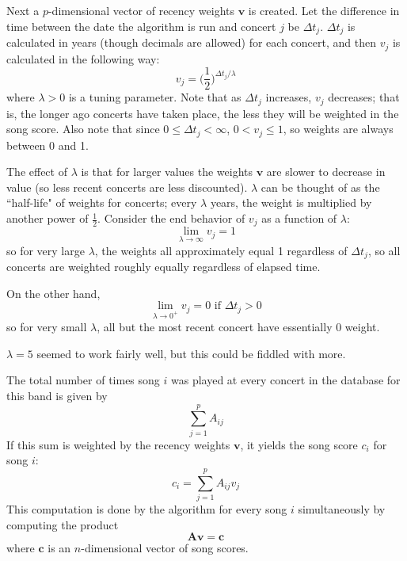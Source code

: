 \documentclass{article}
\begin{document}
Next a \(p\)-dimensional vector of recency weights \(\boldsymbol{v}\) is created. Let the difference in time between the date the algorithm is run and concert \(j\) be \(\Delta t_j\).  \(\Delta t_j\) is calculated in years (though decimals are allowed) for each concert, and then \(v_j\) is calculated in the following way: \begin{equation}v_j = \bigg(\frac{1}{2} \bigg)^{\Delta t_j/\lambda}\end{equation}where \(\lambda > 0\) is a tuning parameter. Note that as \(\Delta t_j\) increases, \(v_j\) decreases; that is, the longer ago concerts have taken place, the less they will be weighted in the song score. Also note that since \(0 \leq \Delta t_j < \infty\), \(0 < v_j \leq 1\), so weights are always between 0 and 1.

The effect of \(\lambda\) is that for larger values the weights \(\boldsymbol{v}\) are slower to decrease in value (so less recent concerts are less discounted). \(\lambda\) can be thought of as the ``half-life" of weights for concerts; every \(\lambda\) years, the weight is multiplied by another power of \(\frac{1}{2}\). Consider the end behavior of \(v_j\) as a function of \(\lambda\): \begin{equation}\lim_{\lambda \to \infty} v_j = 1 \end{equation}so for very large \(\lambda\), the weights all approximately equal 1 regardless of \(\Delta t_j\), so all concerts are weighted roughly equally regardless of elapsed time.

On the other hand, \begin{equation}\lim_{\lambda \to 0^+} v_j = 0 \text{ if } \Delta t_j > 0 \end{equation} so for very small \(\lambda\), all but the most recent concert have essentially 0 weight.

\(\lambda = 5\) seemed to work fairly well, but this could be fiddled with more.

The total number of times song \(i\) was played at every concert in the database for this band is given by \begin{equation} \sum_{j=1}^p A_{ij} \end{equation}If this sum is weighted by the recency weights \(\boldsymbol{v}\), it yields the song score \(c_i\) for song \(i\): \begin{equation}c_i = \sum_{j=1}^p A_{ij}v_j \end{equation}This computation is done by the algorithm for every song \(i\) simultaneously by computing the product \begin{equation}\boldsymbol{A} \boldsymbol{v} = \boldsymbol{c} \end{equation}where \(\boldsymbol{c}\) is an \(n\)-dimensional vector of song scores.
\end{document}
